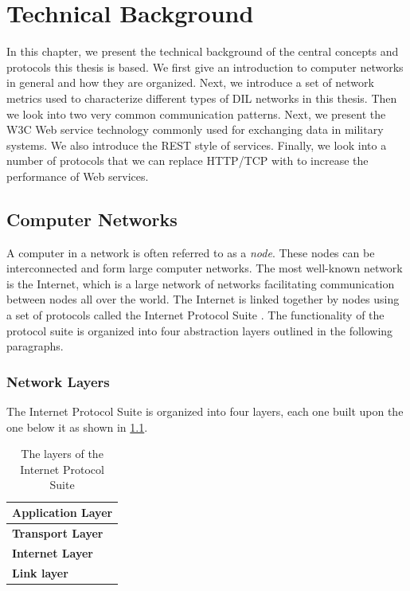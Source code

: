 \chapter{Technical Background}
\label{chapter:background}

In this chapter, we present the technical background of the central concepts and
protocols this thesis is based. We first give an introduction to computer
networks in general and how they are organized. Next, we introduce a set of
network metrics used to characterize different types of DIL networks in this
thesis. Then we look into two very common communication patterns. Next, we
present the W3C Web service technology commonly used for exchanging data in
military systems. We also introduce the REST style of services. Finally, we look
into a number of protocols that we can replace HTTP/TCP with to increase the
performance of Web services.


\section{Computer Networks}

A computer in a network is often referred to as a \textit{node}. These nodes can
be interconnected and form large computer networks. The most well-known network
is the Internet, which is a large network of networks facilitating communication
between nodes all over the world. The Internet is linked together by nodes using
a set of protocols called the Internet Protocol Suite \cite{rfc-1122}. The
functionality of the protocol suite is organized into four abstraction layers
outlined in the following paragraphs.

\subsection{Network Layers}

The Internet Protocol Suite is organized into four layers, each one built upon
the one below it as shown in \cref{figure-network-layers}.

\begin{table}[h]
\begin{tabularx}{\textwidth}{| X |}
\hline
  \textbf{Application Layer} \\ \hline
  \textbf{Transport Layer} \\ \hline
  \textbf{Internet Layer} \\ \hline
  \textbf{Link layer} \\ \hline
\end{tabularx}
\caption{The layers of the Internet Protocol Suite}
\label{figure-network-layers}
\end{table}

